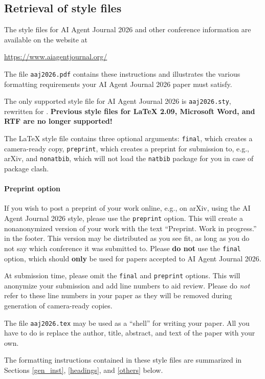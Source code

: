 \documentclass{article}
\begin{document}
\subsection{Retrieval of style files}


The style files for AI Agent Journal 2026 and other conference information are available on
the website at
\begin{center}
  \url{https://www.aiagentjournal.org/}
\end{center}
The file \verb+aaj2026.pdf+ contains these instructions and illustrates the
various formatting requirements your AI Agent Journal 2026 paper must satisfy.


The only supported style file for AI Agent Journal 2026 is \verb+aaj2026.sty+,
rewritten for \LaTeXe{}.  \textbf{Previous style files for \LaTeX{} 2.09,
  Microsoft Word, and RTF are no longer supported!}


The \LaTeX{} style file contains three optional arguments: \verb+final+, which
creates a camera-ready copy, \verb+preprint+, which creates a preprint for
submission to, e.g., arXiv, and \verb+nonatbib+, which will not load the
\verb+natbib+ package for you in case of package clash.


\paragraph{Preprint option}
If you wish to post a preprint of your work online, e.g., on arXiv, using the
AI Agent Journal 2026 style, please use the \verb+preprint+ option. This will create a
nonanonymized version of your work with the text ``Preprint. Work in progress.''
in the footer. This version may be distributed as you see fit, as long as you do not say which conference it was submitted to. Please \textbf{do
  not} use the \verb+final+ option, which should \textbf{only} be used for
papers accepted to AI Agent Journal 2026.


At submission time, please omit the \verb+final+ and \verb+preprint+
options. This will anonymize your submission and add line numbers to aid
review. Please do \emph{not} refer to these line numbers in your paper as they
will be removed during generation of camera-ready copies.


The file \verb+aaj2026.tex+ may be used as a ``shell'' for writing your
paper. All you have to do is replace the author, title, abstract, and text of
the paper with your own.


The formatting instructions contained in these style files are summarized in
Sections \ref{gen_inst}, \ref{headings}, and \ref{others} below.
\end{document}
